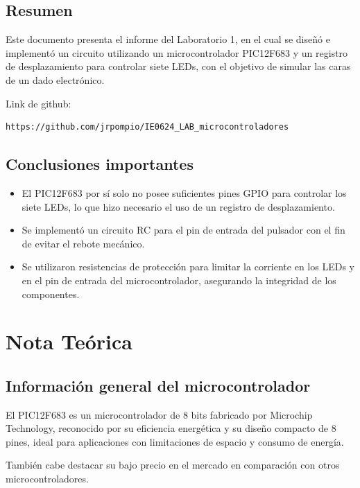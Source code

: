 \documentclass[12pt,a4paper]{article}
\begin{document}
\subsection{Resumen}

Este documento presenta el informe del Laboratorio 1, en
el cual se diseñó e implementó un circuito utilizando un
microcontrolador PIC12F683 y un registro de
desplazamiento para controlar siete LEDs, con el objetivo
de simular las caras de un dado electrónico.

Link de github:\\
\begin{verbatim}
https://github.com/jrpompio/IE0624_LAB_microcontroladores
\end{verbatim}

\subsection{Conclusiones importantes}

\begin{itemize}
    \item El PIC12F683 por sí solo no posee suficientes
          pines GPIO para controlar los siete LEDs, lo que
          hizo necesario el uso de un registro de
          desplazamiento.
    \item Se implementó un circuito RC para el pin de
          entrada del pulsador con el fin de evitar el
          rebote mecánico.
    \item Se utilizaron resistencias de protección para
          limitar la corriente en los LEDs y en el pin de
          entrada del microcontrolador, asegurando la
          integridad de los componentes.
\end{itemize}

\section{Nota Teórica}

\subsection{Información general del microcontrolador}

El PIC12F683 es un microcontrolador de 8 bits fabricado por
Microchip Technology, reconocido por su eficiencia energética y
su diseño compacto de 8 pines, ideal para aplicaciones con
limitaciones de espacio y consumo de energía.

También cabe destacar su bajo precio en el mercado
en comparación con otros microcontroladores.
\end{document}
